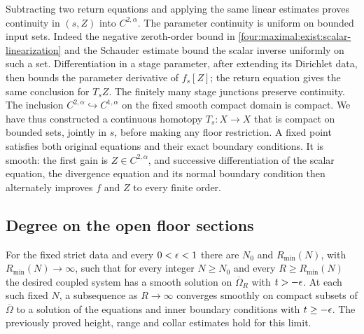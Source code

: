 Subtracting two return equations and applying the same linear
estimates proves continuity in $(s,Z)$ into $C^{2,\alpha}$.
The parameter continuity is uniform on bounded input sets.  Indeed
the negative zeroth-order bound in \eqref{four:maximal:exist:scalar-linearization}
and the Schauder estimate bound the scalar inverse uniformly on
such a set.  Differentiation in a stage parameter, after extending
its Dirichlet data, then bounds the parameter derivative of $f_s[Z]$;
the return equation gives the same conclusion for $T_sZ$.
The finitely many stage junctions preserve continuity.
The inclusion $C^{2,\alpha}\hookrightarrow C^{1,\alpha}$ on the
fixed smooth compact domain is compact.  We have thus constructed
a continuous homotopy $T_s:X\to X$ that is compact on bounded sets,
jointly in $s$, before making any floor restriction.
A fixed point satisfies both original equations and their exact
boundary conditions.  It is smooth: the first gain is
$Z\in C^{2,\alpha}$, and successive differentiation of the scalar
equation, the divergence equation and its normal boundary condition
then alternately improves $f$ and $Z$ to every finite order.

\subsection{Degree on the open floor sections}

\begin{proposition}\label{four:maximal:prop:existence}
For the fixed strict data and every $0<\epsilon<1$ there are $N_0$ and
$R_{\min}(N)$, with $R_{\min}(N)\to\infty$, such that for every
integer $N\ge N_0$ and every $R\ge R_{\min}(N)$ the desired coupled
system has a smooth solution on $\overline\Omega_R$ with
$t>-\epsilon$.  At each such fixed $N$, a subsequence as $R\to\infty$
converges smoothly on compact subsets of $\overline\Omega$ to a
solution of the equations and inner boundary conditions with
$t\ge-\epsilon$.  The previously proved height, range and collar
estimates hold for this limit.
\end{proposition}

